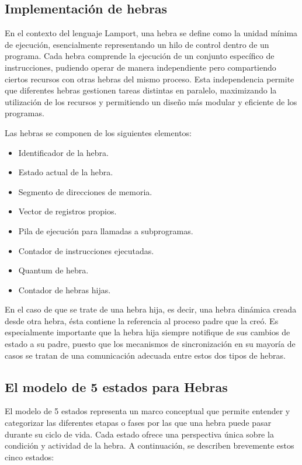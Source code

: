 \subsection{Implementación de hebras}
En el contexto del lenguaje Lamport, una hebra se define como la unidad mínima de ejecución, esencialmente representando un hilo de control dentro de un programa. Cada hebra comprende la ejecución de un conjunto específico de instrucciones, pudiendo operar de manera independiente pero compartiendo ciertos recursos con otras hebras del mismo proceso. Esta independencia permite que diferentes hebras gestionen tareas distintas en paralelo, maximizando la utilización de los recursos y permitiendo un diseño más modular y eficiente de los programas.



\noindent
Las hebras se componen de los siguientes elementos:
\begin{itemize}
    \item Identificador de la hebra.
    \item Estado actual de la hebra.
    \item Segmento de direcciones de memoria.
    \item Vector de registros propios.
    \item Pila de ejecución para llamadas a subprogramas.
    \item Contador de instrucciones ejecutadas.
    \item Quantum de hebra.
    \item Contador de hebras hijas.
\end{itemize}


\noindent
En el caso de que se trate de una hebra hija, es decir, una hebra dinámica creada desde otra hebra, ésta contiene la referencia al proceso padre que la creó. Es especialmente importante que la hebra hija siempre notifique de sus cambios de estado a su padre, puesto que los mecanismos de sincronización en su mayoría de casos se tratan de una comunicación adecuada entre estos dos tipos de hebras.

\subsection{El modelo de 5 estados para Hebras}

El modelo de 5 estados representa un marco conceptual que permite entender y categorizar las diferentes etapas o fases por las que una hebra puede pasar durante su ciclo de vida. Cada estado ofrece una perspectiva única sobre la condición y actividad de la hebra. A continuación, se describen brevemente estos cinco estados:

